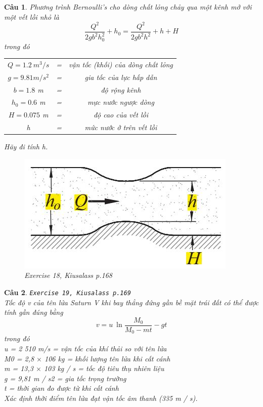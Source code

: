 \documentclass[11pt]{article}
\newtheorem{bt}{Câu}
\begin{document}
\begin{bt}  %
	Phương trình Bernoulli’s cho dòng chất lỏng chảy qua một kênh mở với một vết lồi nhỏ là
	\begin{equation}
		\dfrac{Q^2}{2gb^2h^2_0 } + h_0 = \dfrac{Q^2}{2gb^2h^2} + h + H
	\end{equation}
	trong đó \\
	\begin{tabular}{ccc}
		$Q = 1.2 \ m^3/s$ & = &  vận tốc (khối) của dòng chất lỏng\\ 
		$g = 9.81 m/s^2$ & = &  gia tốc của lực hấp dẫn \\ 
		$b = 1.8$ m & = & độ rộng kênh \\ 
		$h_0 = 0.6$ m & = & mực nước ngược dòng \\
		$H = 0.075$ m & = & độ cao của vết lồi \\ 
		h & = & mức nước ở trên vết lồi \\ 
	\end{tabular}
	
	\noindent Hãy đi tính h. 
	\begin{figure}[h!]
		\centering
		\includegraphics[width=0.4\linewidth]{open_channel}
		\caption{Exercise 18, Kiusalass p.168}
		\label{fig:openchannel}
	\end{figure}
\end{bt}

\newpage 

\begin{bt}  %
\verb|Exercise 19, Kiusalass p.169| \\	
Tốc độ v của tên lửa Saturn V khi bay thẳng đứng gần bề mặt trái đất có thể được tính gần đúng bằng
\begin{equation}
v = u \ \ln \dfrac{M_0}{M_0 - m t} - gt
\end{equation}
trong đó \\
u = 2 510 m/s = vận tốc của khí thải so với tên lửa \\
M0 = 2,8 $\times$ 106 kg = khối lượng tên lửa khi cất cánh \\
m = 13,3 $\times$ 103 kg / s = tốc độ tiêu thụ nhiên liệu \\
g = 9,81 m / s2 = gia tốc trọng trường \\
t = thời gian đo được từ khi cất cánh \\
Xác định thời điểm tên lửa đạt vận tốc âm thanh (335 m / s).
\end{bt}
\end{document}
